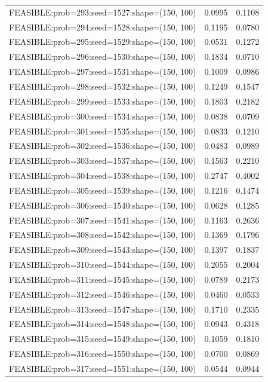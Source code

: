 \begin{longtable}{lcc}
FEASIBLE:prob=293:seed=1527:shape=(150, 100) &   0.0995 & 0.1108 \\
FEASIBLE:prob=294:seed=1528:shape=(150, 100) &   0.1195 & 0.0780 \\
FEASIBLE:prob=295:seed=1529:shape=(150, 100) &   0.0531 & 0.1272 \\
FEASIBLE:prob=296:seed=1530:shape=(150, 100) &   0.1834 & 0.0710 \\
FEASIBLE:prob=297:seed=1531:shape=(150, 100) &   0.1009 & 0.0986 \\
FEASIBLE:prob=298:seed=1532:shape=(150, 100) &   0.1249 & 0.1547 \\
FEASIBLE:prob=299:seed=1533:shape=(150, 100) &   0.1803 & 0.2182 \\
FEASIBLE:prob=300:seed=1534:shape=(150, 100) &   0.0838 & 0.0709 \\
FEASIBLE:prob=301:seed=1535:shape=(150, 100) &   0.0833 & 0.1210 \\
FEASIBLE:prob=302:seed=1536:shape=(150, 100) &   0.0483 & 0.0989 \\
FEASIBLE:prob=303:seed=1537:shape=(150, 100) &   0.1563 & 0.2210 \\
FEASIBLE:prob=304:seed=1538:shape=(150, 100) &   0.2747 & 0.4002 \\
FEASIBLE:prob=305:seed=1539:shape=(150, 100) &   0.1216 & 0.1474 \\
FEASIBLE:prob=306:seed=1540:shape=(150, 100) &   0.0628 & 0.1285 \\
FEASIBLE:prob=307:seed=1541:shape=(150, 100) &   0.1163 & 0.2636 \\
FEASIBLE:prob=308:seed=1542:shape=(150, 100) &   0.1369 & 0.1796 \\
FEASIBLE:prob=309:seed=1543:shape=(150, 100) &   0.1397 & 0.1837 \\
FEASIBLE:prob=310:seed=1544:shape=(150, 100) &   0.2055 & 0.2004 \\
FEASIBLE:prob=311:seed=1545:shape=(150, 100) &   0.0789 & 0.2173 \\
FEASIBLE:prob=312:seed=1546:shape=(150, 100) &   0.0460 & 0.0533 \\
FEASIBLE:prob=313:seed=1547:shape=(150, 100) &   0.1710 & 0.2335 \\
FEASIBLE:prob=314:seed=1548:shape=(150, 100) &   0.0943 & 0.4318 \\
FEASIBLE:prob=315:seed=1549:shape=(150, 100) &   0.1059 & 0.1810 \\
FEASIBLE:prob=316:seed=1550:shape=(150, 100) &   0.0700 & 0.0869 \\
FEASIBLE:prob=317:seed=1551:shape=(150, 100) &   0.0544 & 0.0944 \\

\end{longtable}
